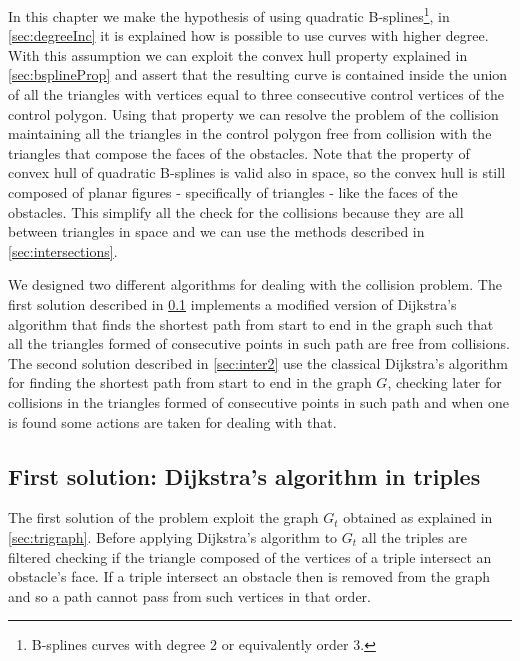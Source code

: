 \documentclass[dissertation.tex]{subfiles}
\begin{document}
In this chapter we make the hypothesis of using
quadratic B-splines\footnote{B-splines curves with degree 2 or equivalently order 3.}, in
\cref{sec:degreeInc} it is explained how is possible to use curves with
higher degree. With this assumption we can exploit the convex hull
property explained in \cref{sec:bsplineProp} and assert that the
resulting curve is contained inside the union of all the triangles
with vertices equal to three consecutive control vertices of the control
polygon. Using that property we can resolve the problem of the
collision maintaining all the triangles in the control polygon free
from collision with the triangles that compose the faces of the
obstacles. Note that the property of convex hull of quadratic
B-splines is valid also in space, so the convex hull is still composed
of planar figures - specifically of triangles - like the faces of the
obstacles. This simplify all the check for the collisions because they
are all between triangles in space and we can use the methods
described in \cref{sec:intersections}.

We designed two different algorithms for dealing with the collision
problem. The first solution described in \cref{sec:inter1} implements
a modified version of Dijkstra's
algorithm that finds the shortest path from start to end in the graph
such that all the triangles formed of consecutive points in such path
are free from collisions. The second solution described in
\cref{sec:inter2} use the classical Dijkstra's algorithm for finding
the shortest path from start to end in the graph $G$, checking later for
collisions in the triangles formed of consecutive points in such path
and when one is found some actions are taken for dealing with that.

\subsection{First solution: Dijkstra's algorithm in triples}\label{sec:inter1}
The first solution of the problem exploit the graph $G_t$ obtained as
explained in \cref{sec:trigraph}. Before applying Dijkstra's algorithm
to $G_t$ all the triples are filtered checking if the
triangle composed of the vertices of a triple intersect an obstacle's
face. If a triple intersect an obstacle then is removed from the graph
and so a path cannot pass from such vertices in that order.
\end{document}
